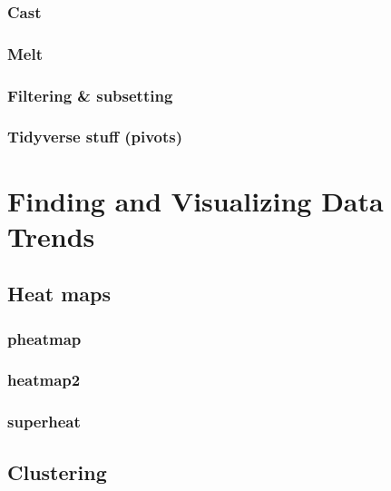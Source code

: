 \documentclass[
]{book}
\begin{document}
\hypertarget{cast}{%
\subsection{Cast}\label{cast}}

\hypertarget{melt}{%
\subsection{Melt}\label{melt}}

\hypertarget{filtering-subsetting}{%
\subsection{Filtering \& subsetting}\label{filtering-subsetting}}

\hypertarget{tidyverse-stuff-pivots}{%
\subsection{Tidyverse stuff (pivots)}\label{tidyverse-stuff-pivots}}

\hypertarget{finding-and-visualizing-data-trends}{%
\chapter{Finding and Visualizing Data Trends}\label{finding-and-visualizing-data-trends}}

\hypertarget{heat-maps}{%
\section{Heat maps}\label{heat-maps}}

\hypertarget{pheatmap}{%
\subsection{pheatmap}\label{pheatmap}}

\hypertarget{heatmap2}{%
\subsection{heatmap2}\label{heatmap2}}

\hypertarget{superheat}{%
\subsection{superheat}\label{superheat}}

\hypertarget{clustering}{%
\section{Clustering}\label{clustering}}
\end{document}
